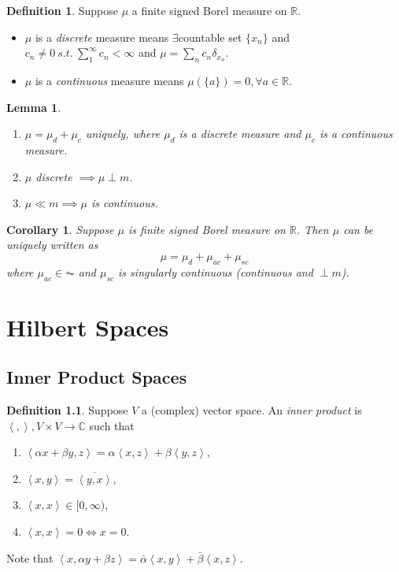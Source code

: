 \documentclass{report}
\newcommand{\R}{\mathbb{R}}
\newcommand{\C}{\mathbb{C}}
\newcommand{\st}{\ s.t.\ }
\newcommand{\inner}[2]{\left\langle #1, #2\right\rangle}
\newcommand{\gen}[1]{\left\langle #1 \right\rangle}
\newtheorem{corollary}[theorem]{Corollary}
\newtheorem{lemma}[theorem]{Lemma}
\theoremstyle{definition}
\newtheorem{definition}[theorem]{Definition}
\theoremstyle{remark}
\begin{document}
\begin{definition}
	Suppose $\mu$ a finite signed Borel measure on $\R$. 
	\begin{itemize}
		\item $\mu$ is a \emph{discrete} measure means $\exists$countable set $\{x_n\}$ and $c_n \neq 0 \st \sum_{1}^\infty c_n < \infty$ and $\mu = \sum_n c_n \delta_{x_n}$.
		\item $\mu$ is a \emph{continuous} measure means $\mu(\{a\}) = 0, \forall a \in \R$.
	\end{itemize}
\end{definition}
\begin{lemma}
	\begin{enumerate}
		\item $\mu = \mu_d + \mu_c$ uniquely, where $\mu_d$ is a discrete measure and $\mu_c$ is a continuous measure.
		\item $\mu$ discrete $\implies \mu \perp m$.
		\item $\mu \ll m \implies \mu$ is continuous.
	\end{enumerate}
\end{lemma}
\begin{corollary}
	Suppose $\mu$ is finite signed Borel measure on $\R$. Then $\mu$ can be uniquely written as \[
		\mu = \mu_d + \mu_{ac} + \mu_{sc}	
	\] where $\mu_{ac} \in \AC$ and $\mu_{sc}$ is singularly continuous (continuous and $\perp m$).
\end{corollary}

\chapter{Hilbert Spaces}
\cite[5.5]{follandRealAnalysisModern1999}
\section{Inner Product Spaces}
\begin{definition}
	Suppose $V$ a (complex) vector space. An \emph{inner product} is $\gen{,}, V \times V \to \C$ such that \begin{enumerate}
		\item $\inner{\alpha x + \beta y}{z} = \alpha\inner{x}{z} + \beta\inner{y}{z}$,
		\item $\inner{x}{y} = \overline{\inner{y}{x}}$,
		\item $\inner{x}{x} \in [0, \infty)$,
		\item $\inner{x}{x} = 0 \iff x = 0$.
	\end{enumerate}
\end{definition}
Note that $\inner{x}{\alpha y + \beta z} = \bar{\alpha}\inner{x}{y} + \bar{\beta} \inner{x}{z}$.
\end{document}
